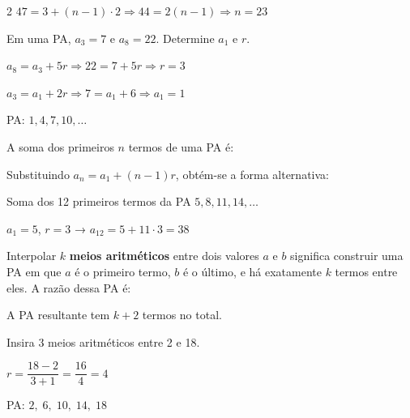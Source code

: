 \documentclass[12pt]{article}
\begin{document}
\begin{multicols}{2}
$47 = 3 + (n-1) \cdot 2 \Rightarrow 44 = 2(n-1) \Rightarrow \boxed{n = 23}$


Em uma PA, $a_3 = 7$ e $a_8 = 22$. Determine $a_1$ e $r$.

$a_8 = a_3 + 5r \Rightarrow 22 = 7 + 5r \Rightarrow r = 3$

$a_3 = a_1 + 2r \Rightarrow 7 = a_1 + 6 \Rightarrow \boxed{a_1 = 1}$

PA: $1, 4, 7, 10, \ldots$


A soma dos primeiros $n$ termos de uma PA é:


Substituindo $a_n = a_1 + (n-1)r$, obtém-se a forma alternativa:




Soma dos 12 primeiros termos da PA $5, 8, 11, 14, \ldots$

$a_1 = 5$, $r = 3$ → $a_{12} = 5 + 11 \cdot 3 = 38$



Interpolar $k$ \textbf{meios aritméticos} entre dois valores $a$ e $b$ significa
construir uma PA em que $a$ é o primeiro termo, $b$ é o último, e há exatamente
$k$ termos entre eles. A razão dessa PA é:


A PA resultante tem $k + 2$ termos no total.


Insira 3 meios aritméticos entre 2 e 18.

$r = \dfrac{18 - 2}{3 + 1} = \dfrac{16}{4} = 4$

PA: $\boxed{2,\; 6,\; 10,\; 14,\; 18}$



\end{multicols}
\end{document}
